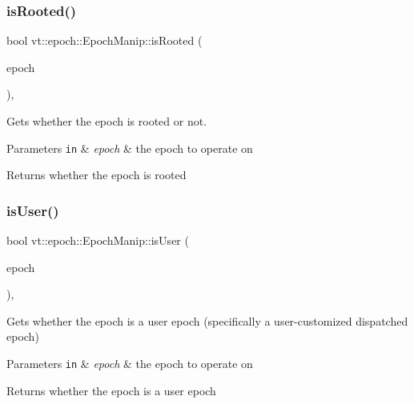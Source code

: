 \subsubsection{\texorpdfstring{is\+Rooted()}{isRooted()}}
{\footnotesize\ttfamily bool vt\+::epoch\+::\+Epoch\+Manip\+::is\+Rooted (\begin{DoxyParamCaption}\item[{\hyperlink{namespacevt_a985a5adf291c34a3ca263b3378388236}{Epoch\+Type} const \&}]{epoch }\end{DoxyParamCaption})\hspace{0.3cm}{\ttfamily [inline]}, {\ttfamily [static]}}



Gets whether the epoch is rooted or not. 


\begin{DoxyParams}[1]{Parameters}
\mbox{\tt in}  & {\em epoch} & the epoch to operate on\\
\hline
\end{DoxyParams}
\begin{DoxyReturn}{Returns}
whether the {\ttfamily epoch} is rooted 
\end{DoxyReturn}
\mbox{\label{structvt_1_1epoch_1_1_epoch_manip_afb2b55c1d422512bc266f04e1aff7904}} 
\subsubsection{\texorpdfstring{is\+User()}{isUser()}}
{\footnotesize\ttfamily bool vt\+::epoch\+::\+Epoch\+Manip\+::is\+User (\begin{DoxyParamCaption}\item[{\hyperlink{namespacevt_a985a5adf291c34a3ca263b3378388236}{Epoch\+Type} const \&}]{epoch }\end{DoxyParamCaption})\hspace{0.3cm}{\ttfamily [inline]}, {\ttfamily [static]}}



Gets whether the epoch is a user epoch (specifically a user-\/customized dispatched epoch) 


\begin{DoxyParams}[1]{Parameters}
\mbox{\tt in}  & {\em epoch} & the epoch to operate on\\
\hline
\end{DoxyParams}
\begin{DoxyReturn}{Returns}
whether the {\ttfamily epoch} is a user epoch 
\end{DoxyReturn}
\mbox{\label{structvt_1_1epoch_1_1_epoch_manip_ac8489de69500dee4376806d56850adbc}} 
